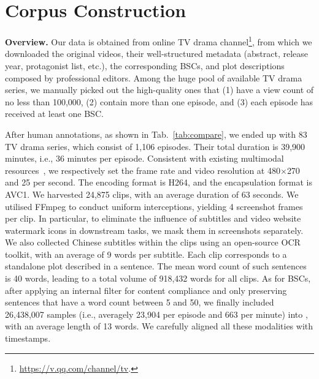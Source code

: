\section{Corpus Construction}
\label{sec:construction}

\noindent\textbf{Overview.} Our data is obtained from online TV drama channel\footnote{\url{https://v.qq.com/channel/tv}.}, from which we downloaded the original videos, their well-structured metadata (abstract, release year, protagonist list, etc.), the corresponding BSCs, and plot descriptions composed by professional editors. 
Among the huge pool of available TV drama series, we manually picked out the high-quality ones that (1) have a view count of no less than 100,000, (2) contain more than one episode, and (3) each episode has received at least one BSC.

After human annotations, as shown in Tab.~\ref{tab:compare}, we ended up with 83 TV drama series, which consist of 1,106 episodes. Their total duration is 39,900 minutes, i.e., 36 minutes per episode.
Consistent with existing multimodal resources~\citep{movienet2020eccv,movie22022arxiv}, we respectively set the frame rate and video resolution at 480$\times$270 and 25 per second.
The encoding format is H264, and the encapsulation format is AVC1.
We harvested 24,875 clips, with an average duration of 63 seconds. We utilised FFmpeg to conduct uniform interceptions, yielding 4 screenshot frames per clip. 
In particular, to eliminate the influence of subtitles and video website watermark icons in downstream tasks, we mask them in screenshots separately.
We also collected Chinese subtitles within the clips using an open-source OCR toolkit, with an average of 9 words per subtitle.
Each clip corresponds to a standalone plot described in a sentence. The mean word count of such sentences is 40 words, leading to a total volume of 918,432 words for all clips.
As for BSCs, after applying an internal filter for content compliance and only preserving sentences that have a word count between 5 and 50, we finally included 26,438,007 samples (i.e., averagely 23,904 per episode and 663 per minute) into \TVD, with an average length of 13 words. 
We carefully aligned all these modalities with timestamps.



\label{sec:genre_tag_sys}


